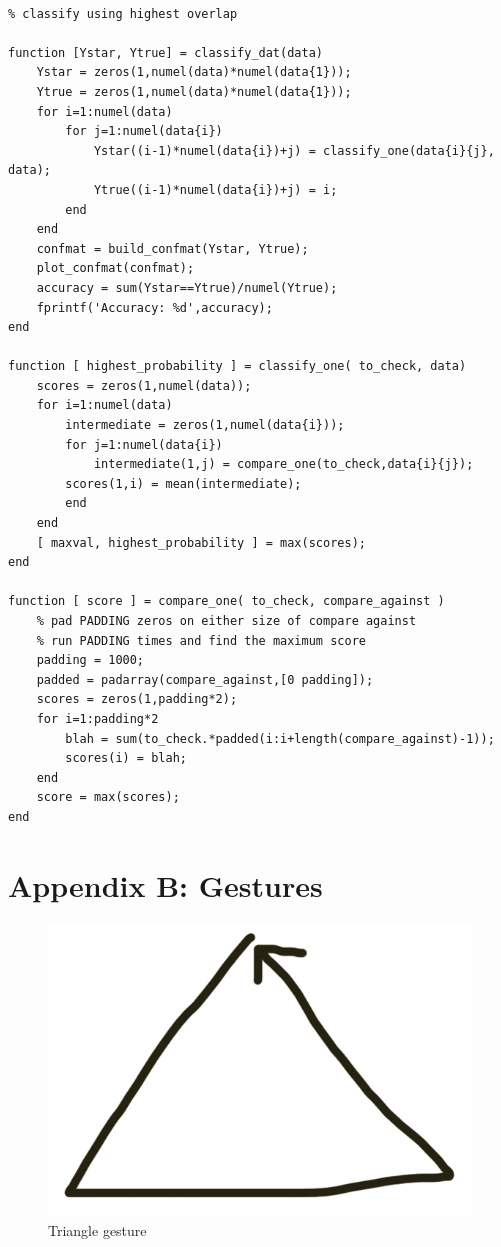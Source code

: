 \documentclass[12pt]{article}
\begin{document}
\begin{verbatim}

% classify using highest overlap

function [Ystar, Ytrue] = classify_dat(data)
    Ystar = zeros(1,numel(data)*numel(data{1}));
    Ytrue = zeros(1,numel(data)*numel(data{1}));
    for i=1:numel(data)
        for j=1:numel(data{i})
            Ystar((i-1)*numel(data{i})+j) = classify_one(data{i}{j}, data);
            Ytrue((i-1)*numel(data{i})+j) = i;
        end
    end
    confmat = build_confmat(Ystar, Ytrue);
    plot_confmat(confmat);
    accuracy = sum(Ystar==Ytrue)/numel(Ytrue);
    fprintf('Accuracy: %d',accuracy);
end

function [ highest_probability ] = classify_one( to_check, data)
    scores = zeros(1,numel(data));
    for i=1:numel(data)
        intermediate = zeros(1,numel(data{i}));
        for j=1:numel(data{i})
            intermediate(1,j) = compare_one(to_check,data{i}{j});
        scores(1,i) = mean(intermediate);
        end
    end
    [ maxval, highest_probability ] = max(scores);
end

function [ score ] = compare_one( to_check, compare_against )
    % pad PADDING zeros on either size of compare against
    % run PADDING times and find the maximum score
    padding = 1000;
    padded = padarray(compare_against,[0 padding]);
    scores = zeros(1,padding*2);
    for i=1:padding*2
        blah = sum(to_check.*padded(i:i+length(compare_against)-1));
        scores(i) = blah;
    end
    score = max(scores);
end

\end{verbatim}


\section{Appendix B: Gestures}

\begin{figure}[h!]
\centering
\includegraphics[scale=0.4]{triangle.png}
\caption{Triangle gesture}
\end{figure}
\end{document}
